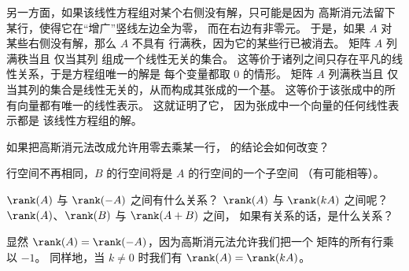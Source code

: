 \begin{exercises}
\begin{answer}
\begin{exparts}
          另一方面，如果该线性方程组对某个右侧没有解，只可能是因为
          高斯消元法留下某行，使得它在“增广”竖线左边全为零，
          而在右边有非零元。
          于是，如果 $A$ 对某些右侧没有解，那么 \( A \) 不具有
          行满秩，因为它的某些行已被消去。
        \partsitem 矩阵 \( A \) 列满秩当且
          仅当其列
          组成一个线性无关的集合。
          这等价于诸列之间只存在平凡的线性关系，于是方程组唯一的解是
          每个变量都取 $0$ 的情形。
        \partsitem 矩阵 \( A \) 列满秩当且
          仅当其列的集合是线性无关的，从而构成其张成的一个基。
          这等价于该张成中的所有向量都有唯一的线性表示。
          这就证明了它，
          因为张成中一个向量的任何线性表示都是
          该线性方程组的解。
      \end{exparts}
    \end{answer}
  \item
    如果把高斯消元法改成允许用零去乘某一行，
     的结论会如何改变？
    \begin{answer}
      行空间不再相同，$B$ 的行空间将是 $A$ 的行空间的一个子空间
      （有可能相等）。
    \end{answer}
  \item
    \( \rank(A) \) 与 \( \rank(-A) \) 之间有什么关系？
    \( \rank(A) \) 与 \( \rank(kA) \) 之间呢？
    \( \rank(A) \)、\( \rank(B) \) 与 \( \rank(A+B) \) 之间，
    如果有关系的话，是什么关系？
    \begin{answer}
      显然 \( \rank(A)=\rank(-A) \)，因为高斯消元法允许我们把一个
      矩阵的所有行乘以 \( -1 \)。
      同样地，当 \( k\neq 0 \) 时我们有 \( \rank(A)=\rank(kA) \)。


\end{answer}
\end{exercises}
